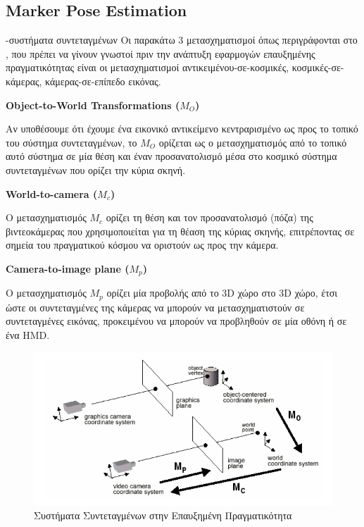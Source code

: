 \subsection{Marker Pose Estimation}



-συστήματα συντεταγμένων
Οι παρακάτω 3 μετασχηματισμοί όπως περιγράφονται στο \cite{Vallino1998}, που πρέπει να γίνουν γνωστοί πριν την ανάπτυξη εφαρμογών επαυξημένης πραγματικότητας είναι οι μετασχηματισμοί αντικειμένου-σε-κοσμικές, κοσμικές-σε-κάμερας, κάμερας-σε-επίπεδο εικόνας. 

\textbf{Object-to-World Transformations ($M_{O}$)}

Αν υποθέσουμε ότι έχουμε ένα εικονικό αντικείμενο κεντραρισμένο ως προς το τοπικό του σύστημα συντεταγμένων, το $M_{O}$ ορίζεται ως ο μετασχηματισμός από το τοπικό αυτό σύστημα σε μία θέση και έναν προσανατολισμό μέσα στο κοσμικό σύστημα συντεταγμένων που ορίζει την κύρια σκηνή.

\textbf{World-to-camera ($M_{c}$)}

Ο μετασχηματισμός $M_{c}$ ορίζει τη θέση και τον προσανατολισμό (πόζα) της βιντεοκάμερας που χρησιμοποιείται για τη θέαση της κύριας σκηνής, επιτρέποντας σε σημεία του πραγματικού κόσμου να οριστούν ως προς την κάμερα.

\textbf{Camera-to-image plane ($M_{p}$)}

Ο μετασχηματισμός $M_{p}$ ορίζει μία προβολής από το 3D χώρο στο 3D χώρο, έτσι ώστε οι συντεταγμένες της κάμερας να μπορούν να μετασχηματιστούν σε συντεταγμένες εικόνας, προκειμένου να μπορούν να προβληθούν σε μία οθόνη ή σε ένα HMD.


\begin{figure}[H]
    \centering
    \includegraphics[scale=1.3, angle=0]{Files/Figures/coordinatesystems.png}
    \caption[Συστήματα Συντεταγμένων στην Επαυξημένη Πραγματικότητα]{Συστήματα Συντεταγμένων στην Επαυξημένη Πραγματικότητα}
    \label{fig:coordinatesystems}
\end{figure}

